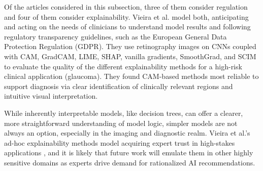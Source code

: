 \documentclass[authoryear,preprint,12pt]{elsarticle}
\begin{document}
Of the articles considered in this subsection, three of them consider regulation
and four of them consider explainability. Vieira et al.
\cite{vieiraExploringTransparencyComparative2025} model both, anticipating and
acting on the needs of clinicians to understand model results and following
regulatory transparency guidelines, such as the European General Data Protection
Regulation (GDPR). They use retinography images on CNNs coupled with CAM,
GradCAM, LIME, SHAP, vanilla gradients, SmoothGrad, and SCIM to evaluate the
quality of the different explainability methods for a high-risk clinical
application (glaucoma). They found CAM-based methods most reliable to support
diagnosis via clear identification of clinically relevant regions and intuitive
visual interpretation.

While inherently interpretable models, like decision trees, can offer a clearer,
more straightforward understanding of model logic, simpler models are not always
an option, especially in the imaging and diagnostic realm. Vieira et al.'s
ad-hoc explainability methods model acquiring expert trust in high-stakes
applications \cite{vieiraExploringTransparencyComparative2025}, and it is likely
that future work will emulate them in other highly sensitive domains as experts
drive demand for rationalized AI recommendations.
\end{document}
